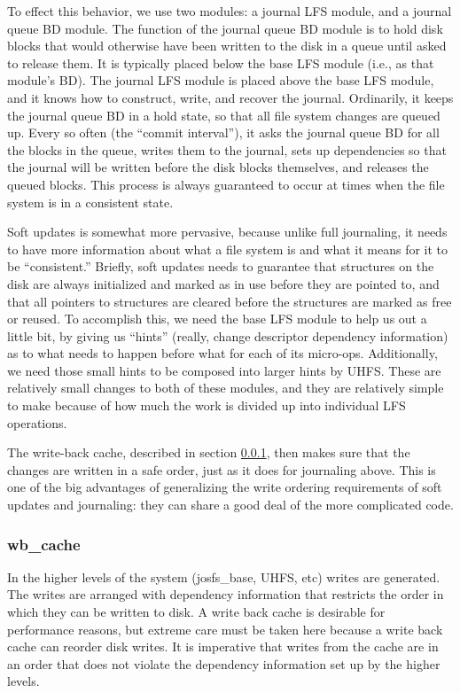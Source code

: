 To effect this behavior, we use two modules: a journal LFS module, and a journal
queue BD module. The function of the journal queue BD module is to hold disk
blocks that would otherwise have been written to the disk in a queue until asked
to release them. It is typically placed below the base LFS module (i.e., as that
module's BD). The journal LFS module is placed above the base LFS module, and it
knows how to construct, write, and recover the journal. Ordinarily, it keeps the
journal queue BD in a hold state, so that all file system changes are queued up.
Every so often (the ``commit interval''), it asks the journal queue BD for all
the blocks in the queue, writes them to the journal, sets up dependencies so
that the journal will be written before the disk blocks themselves, and releases
the queued blocks. This process is always guaranteed to occur at times when the
file system is in a consistent state.

Soft updates is somewhat more pervasive, because unlike full journaling, it
needs to have more information about what a file system is and what it means for
it to be ``consistent.'' Briefly, soft updates needs to guarantee that
structures on the disk are always initialized and marked as in use before they
are pointed to, and that all pointers to structures are cleared before the
structures are marked as free or reused. To accomplish this, we need the base
LFS module to help us out a little bit, by giving us ``hints'' (really, change
descriptor dependency information) as to what needs to happen before what for
each of its micro-ops. Additionally, we need those small hints to be composed
into larger hints by UHFS. These are relatively small changes to both of these
modules, and they are relatively simple to make because of how much the work is
divided up into individual LFS operations.

The write-back cache, described in section \ref{sec:solution:impl:wbcache}, then
makes sure that the changes are written in a safe order, just as it does for
journaling above. This is one of the big advantages of generalizing the write
ordering requirements of soft updates and journaling: they can share a good deal
of the more complicated code.

\subsubsection{wb\_cache}
\label{sec:solution:impl:wbcache}

In the higher levels of the system (josfs\_base, UHFS, etc) writes are
generated. The writes are arranged with dependency information that restricts
the order in which they can be written to disk. A write back cache is desirable
for performance reasons, but extreme care must be taken here because a write
back cache can reorder disk writes. It is imperative that writes from the cache
are in an order that does not violate the dependency information set up by the
higher levels.

